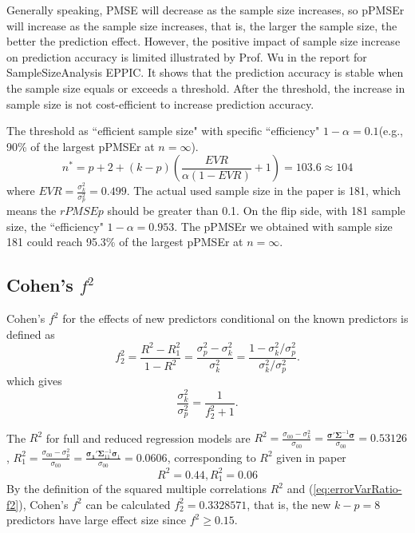 \documentclass[11pt]{article}
\begin{document}
Generally speaking, PMSE will decrease as the sample size increases, so pPMSEr will increase as the sample size increases, that is, the larger the sample size, the better the prediction effect. However, the positive impact of sample size increase on prediction accuracy is limited illustrated by Prof. Wu in the report for SampleSizeAnalysis EPPIC.
It shows that the prediction accuracy is stable when the sample size equals or exceeds a threshold. After the threshold, the increase in sample size is not cost-efficient to increase prediction accuracy. 

The threshold as ``efficient sample size" with specific ``efficiency" $1-\alpha = 0.1$(e.g., 90\% of the largest pPMSEr at $n=\infty$). 
$$
n^* = p+2+(k-p)\left(\frac{EVR}{\alpha(1-EVR)}+1\right) = 103.6\approx 104
$$
where $EVR = \frac{\sigma_k^2}{\sigma_p^2}=0.499$.
The actual used sample size in the paper is 181, which means the $rPMSEp$ should be greater than 0.1. On the flip side, with 181 sample size, the ``efficiency" $1-\alpha = 0.953$. The pPMSEr we obtained with sample size 181 could reach 95.3\% of the largest pPMSEr at $n=\infty$.


\subsection{Cohen's $f^2$}

Cohen's $f^2$ for the effects of new predictors conditional on the known predictors is defined as
\begin{equation}
\label{eq:f2}
f_2^2 = \frac{R^2 - R_1^2}{1- R^2} = \frac{\sigma_p^2 - \sigma_k^2}{\sigma_k^2} = \frac{1 - \sigma_k^2/\sigma_p^2}{\sigma_k^2/\sigma_p^2}.
\end{equation}
which gives 
\begin{equation}
\label{eq:errorVarRatio-f2}
\frac{\sigma_k^2}{\sigma_p^2}=\frac{1}{f_2^2 + 1}.
\end{equation}

The $R^2$ for full and reduced regression models are 
$R^2 = \frac{\sigma_{00}-\sigma^2_k}{\sigma_{00}} = \frac{\boldsymbol{\sigma}' \boldsymbol{\Sigma}^{-1} \boldsymbol{\sigma}}{\sigma_{00}} = 0.53126$, $R_1^2 = \frac{\sigma_{00}-\sigma^2_p}{\sigma_{00}} = \frac{\boldsymbol{\sigma_1}' \boldsymbol{\Sigma}_{11}^{-1} \boldsymbol{\sigma}_1}{\sigma_{00}} = 0.0606$,
corresponding to $R^2$ given in paper
$$R^2 = 0.44, R_1^2 = 0.06$$
By the definition of the squared multiple correlations $R^2$ and (\ref{eq:errorVarRatio-f2}), Cohen's $f^2$ can be calculated $f_2^2 = 0.3328571$, that is, the new $k-p = 8$ predictors have large effect size since $f^2\ge 0.15$.



\end{document}
